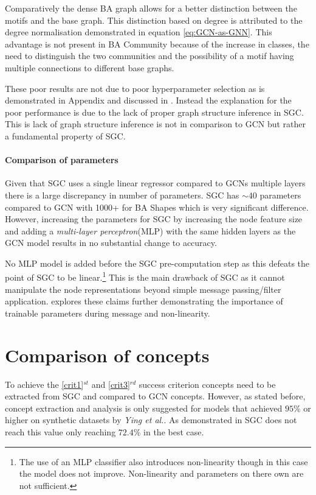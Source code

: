 Comparatively the dense BA graph allows for a better distinction between the motifs and the base graph.
This distinction based on degree is attributed to the degree normalisation demonstrated in equation \ref{eq:GCN-as-GNN}.
This advantage is not present in BA Community because of the increase in classes, the need to distinguish the two communities and the possibility of a motif having multiple connections to different base graphs.

These poor results are not due to poor hyperparameter selection as is demonstrated in Appendix  and discussed in .
Instead the explanation for the poor performance is due to the lack of proper graph structure inference in SGC.
This is lack of graph structure inference is not in comparison to GCN but rather a fundamental property of SGC.

\paragraph{Comparison of parameters}
Given that SGC uses a single linear regressor compared to GCNs multiple layers there is a large discrepancy in number of parameters.
SGC has $\sim40$ parameters compared to GCN with 1000+ for BA Shapes which is very significant difference.
However, increasing the parameters for SGC by increasing the node feature size and adding a \emph{multi-layer perceptron}(MLP) with the same hidden layers as the GCN model results in no substantial change to accuracy.

No MLP model is added before the SGC pre-computation step as this defeats the point of SGC to be linear.\footnote{The use of an MLP classifier also introduces non-linearity though in this case the model does not improve. Non-linearity and parameters on there own are not sufficient.}
This is the main drawback of SGC as it cannot manipulate the node representations beyond simple message passing/filter application.
 explores these claims further demonstrating the importance of trainable parameters during message and non-linearity.

\section{Comparison of concepts}
\label{sec:comp-concept}

To achieve the \ref{crit1}$^{st}$ and \ref{crit3}$^{rd}$ success criterion concepts need to be extracted from SGC and compared to GCN concepts.
However, as stated before, concept extraction and analysis is only suggested for models that achieved $95$\% or higher on synthetic datasets by \textit{Ying et al.}\cite{ying2019gnnexplainer}.
As demonstrated in  SGC does not reach this value only reaching $72.4$\% in the best case.

